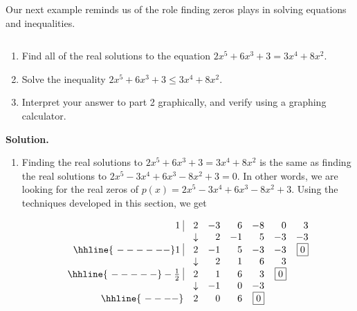 \medskip

Our next example reminds us of the role finding zeros plays in solving equations and inequalities.

\begin{ex}  \label{polyeqineqexample} $~$

\begin{enumerate}

\item  Find all of the real solutions to the equation $2x^5+6x^3+3 = 3x^4+8x^2$. 

\item  Solve the inequality $2x^5+6x^3+3 \leq 3x^4+8x^2$.

\item  Interpret your answer to part 2 graphically, and verify using a graphing calculator.


\end{enumerate}

{\bf Solution.} 

\begin{enumerate}

\item  Finding the real solutions to $2x^5+6x^3+3 = 3x^4+8x^2$ is the same as finding the real solutions to $2x^5-3x^4+6x^3-8x^2+3=0$.  In other words, we are looking for the real zeros of $p(x)=  2x^5-3x^4+6x^3-8x^2+3$.  Using the techniques developed in this section, we get

\[\begin{array}{rrrrrrr}
1 \, \, \vline& 2 & -3 & 6  & -8 & 0 &3 \\

  & \downarrow     &  2  &  -1  & 5 & -3 & -3\\ \hhline{~------} 

 1 \, \, \vline& 2 & -1 & 5  & -3 & -3 & \fbox{$0$} \\

  & \downarrow     &  2 &  1  & 6 & 3 &\\ \hhline{~-----} 
  
  -\frac{1}{2} \, \, \vline&  2 &  1  & 6 & 3 &  \fbox{$0$} & \\
    
               & \downarrow &  -1  &  0  & -3 &&\\ \hhline{~----} 
 
   & 2  &   0  & 6& \fbox{0} &&   \\
  


\end{array}\]



\end{enumerate}
\end{ex}
